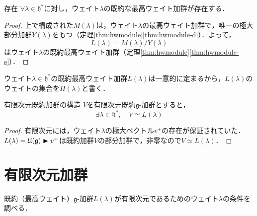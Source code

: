 \documentclass[rep_main]{subfiles}
\begin{document}
\begin{mytheo}[label=thm:hwmodule-exist]{存在}
	$\forall \lambda \in \mathfrak{h}^*$に対し，ウェイト$\lambda$の既約な最高ウェイト加群が存在する．
\end{mytheo}
\begin{proof}
	上で構成された$M(\lambda)$は，ウェイト$\lambda$の最高ウェイト加群で，唯一の極大部分加群$Y(\lambda)$をもつ（定理\ref{thm:hwmodule}\ref{thm:hwmodule-d}）．よって，
	\begin{equation}
		L(\lambda) = M(\lambda) / Y(\lambda)
	\end{equation}
	はウェイト$\lambda$の既約最高ウェイト加群（定理\ref{thm:hwmodule}\ref{thm:hwmodule-e}）．
\end{proof}
ウェイト$\lambda \in \mathfrak{h}^*$の既約最高ウェイト加群$L(\lambda)$は一意的に定まるから，$L(\lambda)$のウェイトの集合を$\Pi(\lambda)$と書く．
\begin{mytheo}[label=thm:finite-irr-mod]{有限次元既約加群の構造}
	$V$を有限次元既約$\mathfrak{g}$-加群とすると，
	\begin{equation}
		\exists \lambda \in \mathfrak{h}^*,\quad  V \simeq L(\lambda)
	\end{equation}
\end{mytheo}
\begin{proof}
	有限次元には，ウェイト$\lambda$の極大ベクトル$v^+$の存在が保証されていた．$L(\lambda) = \mathfrak{U}(\mathfrak{g}) \blacktriangleright v^+$は既約加群$V$の部分加群で，非零なので$V \simeq L(\lambda)$．
\end{proof}

\section{有限次元加群}
既約（最高ウェイト）$\mathfrak{g}$-加群$L(\lambda)$が有限次元であるためのウェイト$\lambda$の条件を調べる．
\end{document}
